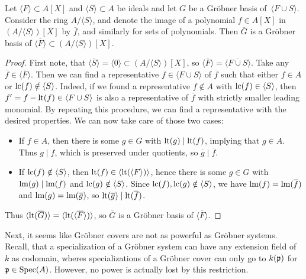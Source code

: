 \begin{lemma}\label{lem:quot_grb}
  Let $\langle F \rangle \subset A[X]$ and $\langle S \rangle \subset A$ be ideals and let $G$ be a Gröbner basis of $\,\langle F \cup S \rangle$. Consider the ring $A/\langle S \rangle$, and denote the image of a polynomial $f \in A[X]$ in $(A/\langle S \rangle)[X]$ by $\overline f$, and similarly for sets of polynomials. Then $\overline G$ is a Gröbner basis of $\langle \overline F \rangle \subset (A/\langle S \rangle)[X]$.
\end{lemma}
\begin{proof}
  First note, that $\langle \overline S \rangle = \langle 0 \rangle \subset (A/\langle S \rangle)[X]$, so $\langle \overline F \rangle = \langle \overline{F \cup S} \rangle$. Take any $\overline f \in \langle \overline F \rangle$. Then we can find a representative $f \in \langle F \cup S \rangle$ of $\overline f$ such that either $f \in A$ or $\operatorname{lc}(f) \notin \langle S \rangle$. Indeed, if we found a representative $f \notin A$ with $\operatorname{lc}(f) \in \langle S \rangle$, then $f' = f - \operatorname{lt}(f) \in \langle F \cup S \rangle$ is also a representative of $\overline f$ with strictly smaller leading monomial. By repeating this procedure, we can find a representative with the desired properties. We can now take care of those two cases:
  \begin{itemize}
    \item If $f \in A$, then there is some $g \in G$ with $\operatorname{lt}(g) \mid \operatorname{lt}(f)$, implying that $g \in A$. Thus $g \mid f$, which is preserved under quotients, so $\overline g \mid \overline f$.
    \item If $\operatorname{lc}(f) \notin \langle S \rangle$, then $\operatorname{lt}(f) \in \langle \operatorname{lt}(\langle F \rangle) \rangle$, hence there is some $g \in G$ with $\operatorname{lm}(g) \mid \operatorname{lm}(f)$ and $\operatorname{lc}(g) \notin \langle S \rangle$. Since $\operatorname{lc}(f), \operatorname{lc}(g) \notin \langle S \rangle$, we have $\operatorname{lm}(f) = \operatorname{lm}(\overline f)$ and $\operatorname{lm}(g) = \operatorname{lm}(\overline g)$, so $\operatorname{lt}(\overline g) \mid \operatorname{lt}(\overline f)$.
  \end{itemize}
  Thus $\langle \operatorname{lt}(\overline G) \rangle = \langle \operatorname{lt}(\langle \overline F \rangle) \rangle$, so $\overline G$ is a Gröbner basis of $\langle \overline F \rangle$.
\end{proof}

Next, it seems like Gröbner covers are not as powerful as Gröbner systems. Recall, that a specialization of a Gröbner system can have any extension field of $k$ as codomain, wheres specializations of a Gröbner cover can only go to $k(\mathfrak p)$ for $\mathfrak p \in \operatorname{Spec}(A)$. However, no power is actually lost by this restriction.

